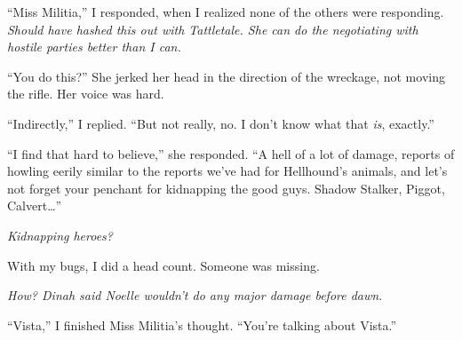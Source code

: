 ``Miss Militia,'' I responded, when I realized none of the others were responding.  \emph{Should have hashed this out with Tattletale.  She can do the negotiating with hostile parties better than I can.}



``You do this?''  She jerked her head in the direction of the wreckage, not moving the rifle.  Her voice was hard.



``Indirectly,'' I replied.  ``But not really, no.  I don't know what that \emph{is}, exactly.''



``I find that hard to believe,'' she responded.  ``A hell of a lot of damage, reports of howling eerily similar to the reports we've had for Hellhound's animals, and let's not forget your penchant for kidnapping the good guys.  Shadow Stalker, Piggot, Calvert\ldots''



\emph{Kidnapping heroes?}



With my bugs, I did a head count.  Someone was missing.



\emph{How?  Dinah said Noelle wouldn't do any major damage before dawn}.



``Vista,'' I finished Miss Militia's thought.  ``You're talking about Vista.''





